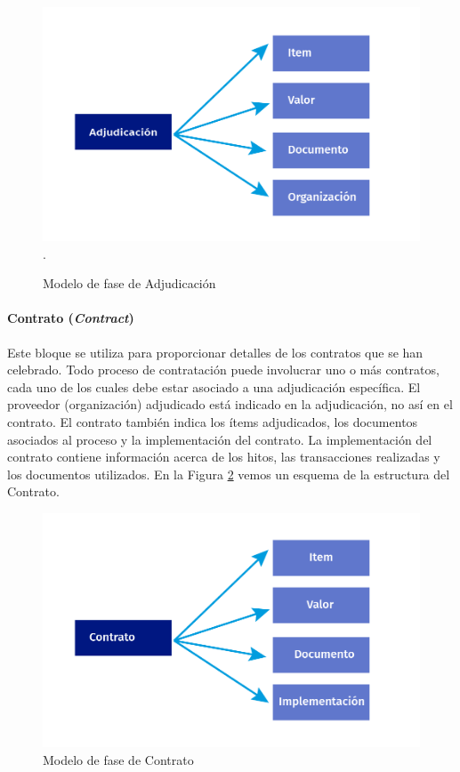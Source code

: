 \begin{figure}[htbp!]
    \centering
    \includegraphics[width=150mm]{figuras/Diagramas_Adjudicacion.png}.
    \caption{Modelo de fase de Adjudicación}
    \label{img:Fase de Adjudiacion}
\end{figure}


\paragraph{Contrato (\textit{Contract})}\hfill \break
Este bloque se utiliza para proporcionar detalles de los contratos que se han celebrado. Todo proceso de contratación puede involucrar uno o más contratos, cada uno de los cuales debe estar asociado a una adjudicación específica. El proveedor (organización) adjudicado está indicado en la adjudicación, no así en el contrato. El contrato también indica los ítems adjudicados, los documentos asociados al proceso y la implementación del contrato. La implementación del contrato contiene información acerca de los hitos, las transacciones realizadas y los documentos utilizados. En la Figura \ref{img:Fase de Contrato} vemos un esquema de la estructura del Contrato.

\begin{figure}[htbp!]
    \centering
    \includegraphics[width=150mm]{figuras/Diagramas_Contrato.png}
    \caption{Modelo de fase de Contrato}
    \label{img:Fase de Contrato}
\end{figure}

